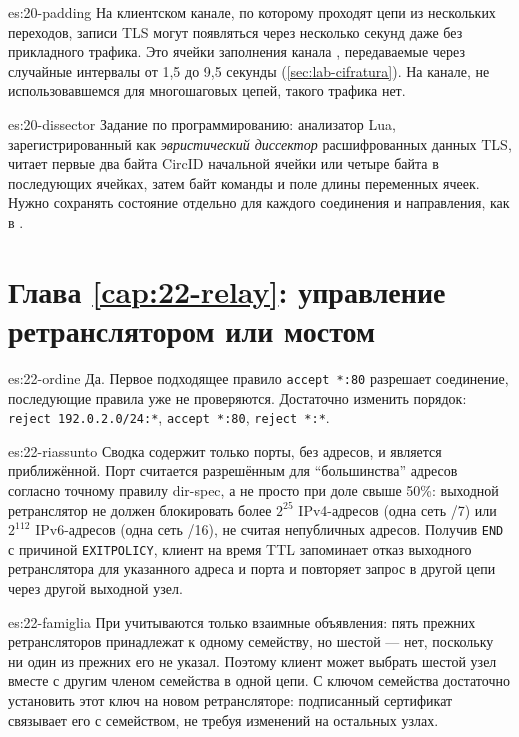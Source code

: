 \begin{soluzione}{es:20-padding}
На клиентском канале, по которому проходят цепи из нескольких переходов, записи TLS могут появляться через несколько секунд даже без прикладного трафика. Это ячейки заполнения канала , передаваемые через случайные интервалы от 1,5 до 9,5 секунды (\cref{sec:lab-cifratura}). На канале, не использовавшемся для многошаговых цепей, такого трафика нет.
\end{soluzione}

\begin{soluzione}{es:20-dissector}
Задание по программированию: анализатор Lua, зарегистрированный как \emph{эвристический диссектор} расшифрованных данных TLS, читает первые два байта CircID начальной ячейки  или четыре байта в последующих ячейках, затем байт команды и поле длины переменных ячеек. Нужно сохранять состояние отдельно для каждого соединения и направления, как в .
\end{soluzione}

\section*{Глава \ref{cap:22-relay}: управление ретранслятором или мостом}

\begin{soluzione}{es:22-ordine}
Да. Первое подходящее правило \texttt{accept *:80} разрешает соединение, последующие правила уже не проверяются. Достаточно изменить порядок: \texttt{reject 192.0.2.0/24:*}, \texttt{accept *:80}, \texttt{reject *:*}.
\end{soluzione}

\begin{soluzione}{es:22-riassunto}
Сводка содержит только порты, без адресов, и является приближённой. Порт считается разрешённым для \enquote{большинства} адресов согласно точному правилу dir-spec, а не просто при доле свыше 50\%: выходной ретранслятор не должен блокировать более $2^{25}$ IPv4-адресов (одна сеть /7) или $2^{112}$ IPv6-адресов (одна сеть /16), не считая непубличных адресов. Получив \texttt{END} с причиной \texttt{EXITPOLICY}, клиент на время TTL запоминает отказ выходного ретранслятора для указанного адреса и порта и повторяет запрос в другой цепи через другой выходной узел.
\end{soluzione}

\begin{soluzione}{es:22-famiglia}
При  учитываются только взаимные объявления: пять прежних ретрансляторов принадлежат к одному семейству, но шестой — нет, поскольку ни один из прежних его не указал. Поэтому клиент может выбрать шестой узел вместе с другим членом семейства в одной цепи. С ключом семейства достаточно установить этот ключ на новом ретрансляторе: подписанный сертификат связывает его с семейством, не требуя изменений на остальных узлах.
\end{soluzione}

